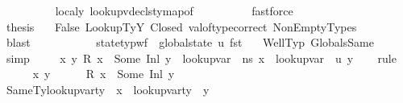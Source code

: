 \begin{isabellebody}
\ \ \ \ \ \ \ \ \isamarkupfalse%
\ localy\ lookup{\isacharunderscore}{\kern0pt}vdecls{\isacharunderscore}{\kern0pt}ty{\isacharunderscore}{\kern0pt}map{\isacharunderscore}{\kern0pt}of\isanewline
\ \ \ \ \ \ \ \ \isamarkupfalse%
\ fastforce\ \ \ \ \ \ \ \ \isanewline
\ \ \ \ \ \ \isamarkupfalse%
\ {\isacharquery}{\kern0pt}thesis\ \isamarkupfalse%
\ \ False\ LookupTyY\ Closed\ val{\isacharunderscore}{\kern0pt}of{\isacharunderscore}{\kern0pt}type{\isacharunderscore}{\kern0pt}correct\ NonEmptyTypes\isanewline
\ \ \ \ \ \ \ \ \isamarkupfalse%
\ blast\isanewline
\ \ \ \ \isamarkupfalse%
\isanewline
\ \ \isamarkupfalse%
\isanewline
{}\isamarkupfalse%
\isanewline
\ \ \isamarkupfalse%
\ {\isachardoublequoteopen}state{\isacharunderscore}{\kern0pt}typ{\isacharunderscore}{\kern0pt}wf\ {\isasymOmega}\ {\isacharparenleft}{\kern0pt}global{\isacharunderscore}{\kern0pt}state\ {\isacharquery}{\kern0pt}u{\isacharparenright}{\kern0pt}\ {\isacharparenleft}{\kern0pt}fst\ {\isasymLambda}{\isacharprime}{\kern0pt}{\isacharparenright}{\kern0pt}{\isachardoublequoteclose}\ \isamarkupfalse%
\ WellTyp\ GlobalsSame\ \isamarkupfalse%
\ simp\isanewline
{}\isamarkupfalse%
\isanewline
\ \ \isamarkupfalse%
\ {\isachardoublequoteopen}{\isasymforall}\ x\ y{\isachardot}{\kern0pt}\ R\ x\ {\isacharequal}{\kern0pt}\ Some\ {\isacharparenleft}{\kern0pt}Inl\ y{\isacharparenright}{\kern0pt}\ {\isasymlongrightarrow}\ lookup{\isacharunderscore}{\kern0pt}var\ {\isasymLambda}\ ns\ x\ {\isacharequal}{\kern0pt}\ lookup{\isacharunderscore}{\kern0pt}var\ {\isasymLambda}{\isacharprime}{\kern0pt}\ {\isacharquery}{\kern0pt}u\ y{\isachardoublequoteclose}\isanewline
\ \ \isamarkupfalse%
\ {\isacharparenleft}{\kern0pt}rule{\isacharplus}{\kern0pt}{\isacharparenright}{\kern0pt}\isanewline
\ \ \ \ \isamarkupfalse%
\ x\ y\isanewline
\ \ \ \ \isamarkupfalse%
\ {\isachardoublequoteopen}R\ x\ {\isacharequal}{\kern0pt}\ Some\ {\isacharparenleft}{\kern0pt}Inl\ y{\isacharparenright}{\kern0pt}{\isachardoublequoteclose}\isanewline
\ \ \ \ \isamarkupfalse%
\ SameTy{\isacharcolon}{\kern0pt}{\isachardoublequoteopen}lookup{\isacharunderscore}{\kern0pt}var{\isacharunderscore}{\kern0pt}ty\ {\isasymLambda}\ x\ {\isacharequal}{\kern0pt}\ lookup{\isacharunderscore}{\kern0pt}var{\isacharunderscore}{\kern0pt}ty\ {\isasymLambda}{\isacharprime}{\kern0pt}\ y{\isachardoublequoteclose}\ \isamarkupfalse%

\end{isabellebody}
